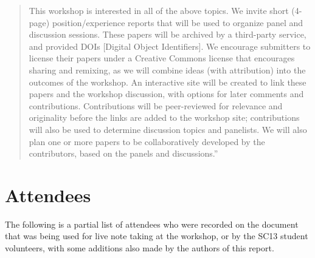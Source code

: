 \documentclass[11pt, oneside]{amsart}
\newcommand{\note}[1]{ {\textcolor{red}    { #1 }}}
\begin{document}
\begin{quote}
This workshop is interested in all of the above topics.  We invite
short (4-page) position/experience reports that will be used to
organize panel and discussion sessions. These papers will be archived
by a third-party service, and provided DOIs [Digital Object
  Identifiers].  We encourage submitters to license their papers under
a Creative Commons license that encourages sharing and remixing, as we
will combine ideas (with attribution) into the outcomes of the
workshop.  An interactive site will be created to link these papers
and the workshop discussion, with options for later comments and
contributions. Contributions will be peer-reviewed for relevance and
originality before the links are added to the workshop site;
contributions will also be used to determine discussion topics and
panelists. We will also plan one or more papers to be collaboratively
developed by the contributors, based on the panels and discussions.''
\end{quote}

\section{Attendees} \label{sec:attendees}  %


The following is a partial list of attendees who were recorded on the
document~\cite{WSSSPE1-google-notes} that was being used for live note
taking at the workshop, or by the SC13 student volunteers, with some
additions also made by the authors of this report.
\end{document}
